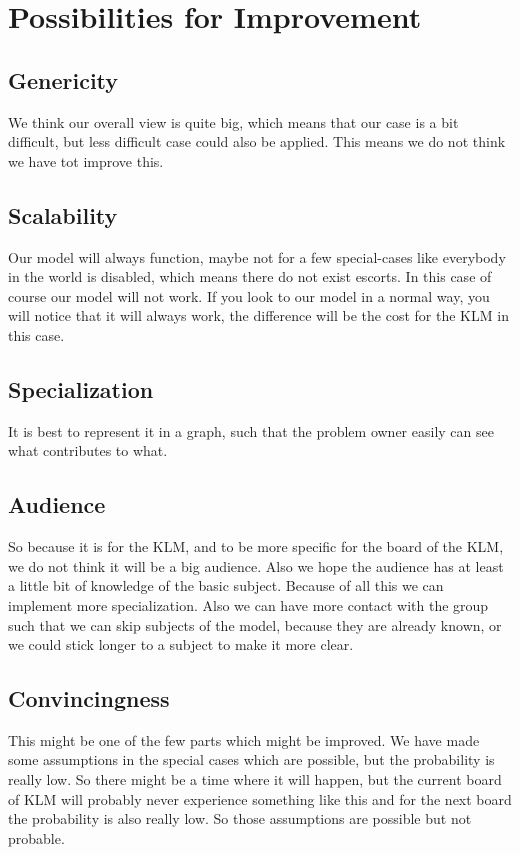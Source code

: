 \documentclass[a4paper, 11pt, notitlepage]{report}
\begin{document}
\chapter{Possibilities for Improvement}
\section{Genericity}
    We think our overall view is quite big, which means that our case is a bit difficult, but less difficult case could also be applied. This means we do not think we have tot improve this.
\section{Scalability}
    Our model will always function, maybe not for a few special-cases like everybody in the world is disabled, which means there do not exist escorts. In this case of course our model will not work. If you look to our model in a normal way, you will notice that it will always work, the difference will be the cost for the KLM in this case.
\section{Specialization}
    It is best to represent it in a graph, such that the problem owner easily can see what contributes to what.
\section{Audience}
    So because it is for the KLM, and to be more specific for the board of the KLM, we do not think it will be a big audience. Also we hope the audience has at least a little bit of knowledge of the basic subject. Because of all this we can implement more specialization. Also we can have more contact with the group such that we can skip subjects of the model, because they are already known, or we could stick longer to a subject to make it more clear.
\section{Convincingness}
    This might be one of the few parts which might be improved. We have made some assumptions in the special cases which are possible, but the probability is really low. So there might be a time where it will happen, but the current board of KLM will probably never experience something like this and for the next board the probability is also really low. So those assumptions are possible but not probable.
\end{document}
